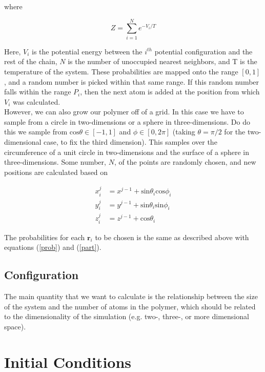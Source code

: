 \documentclass{article}
\begin{document}
\begin{multicols}{2}
\noindent where

\begin{equation}
\label{part}
Z = \sum \limits _{i=1}^{N} e^{-V_i/T}
\end{equation}

\noindent Here, $V_i$ is the potential energy between the $i^{th}$ potential configuration and the rest of the chain, $N$ is the number of unoccupied nearest neighbors, and T is the temperature of the system.  These probabilities are mapped onto the range $[0,1]$, and a random number is picked within that same range.  If this random number falls within the range $P_i$, then the next atom is added at the position from which $V_i$ was calculated.  \\

However, we can also grow our polymer off of a grid.  In this case we have to sample from a circle in two-dimensions or a sphere in three-dimensions.  Do do this we sample from $\mathrm{cos}\theta \in [-1,1]$ and $\phi \in [0,2\pi]$ (taking $\theta = \pi/2$ for the two-dimensional case, to fix the third dimension).  This samples over the circumference of a unit circle in two-dimensions and the surface of a sphere in three-dimensions.  Some number, $N$, of the points are randomly chosen, and new positions are calculated based on 

\begin{equation}
\begin{split}
x^{j}_i & = x^{j-1} + \mathrm{sin}\theta _i \mathrm{cos}\phi _i \\
y^{j}_i & = y^{j-1} + \mathrm{sin} \theta _i \mathrm{sin} \phi _i \\
z^{j}_i & = z^{j-1} + \mathrm{cos} \theta _i
\end{split}
\end{equation}

\noindent The probabilities for each $\textbf{r}_i$ to be chosen is the same as described above with equations (\ref{prob}) and (\ref{part}).

\subsection{Configuration}

The main quantity that we want to calculate is the relationship between the size of the system and the number of atoms in the polymer, which should be related to the dimensionality of the simulation (e.g. two-, three-, or more dimensional space).  

\section{Initial Conditions}
\label{IC}


\end{multicols}
\end{document}
